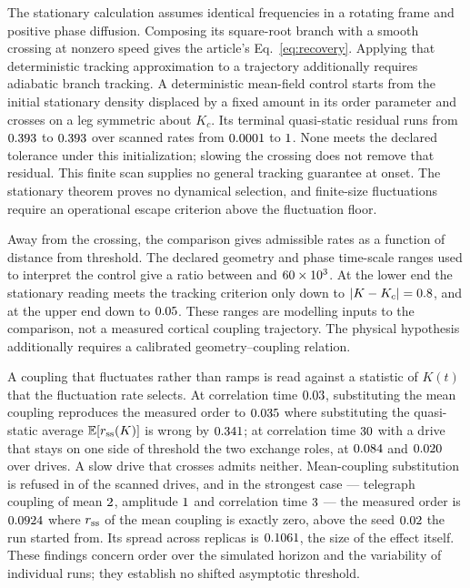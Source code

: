 \documentclass{article}
\begin{document}
The stationary calculation assumes identical frequencies in a rotating frame and positive phase diffusion. Composing its square-root branch with a smooth crossing at nonzero speed gives the article's Eq.~\eqref{eq:recovery}. Applying that deterministic tracking approximation to a trajectory additionally requires adiabatic branch tracking. A deterministic mean-field control starts from the initial stationary density displaced by a fixed amount in its order parameter and crosses on a leg symmetric about $K_c$. Its terminal quasi-static residual runs from $0.393$ to $0.393$ over scanned rates from $0.0001$ to $1$. None meets the declared tolerance under this initialization; slowing the crossing does not remove that residual. This finite scan supplies no general tracking guarantee at onset. The stationary theorem proves no dynamical selection, and finite-size fluctuations require an operational escape criterion above the fluctuation floor.

Away from the crossing, the comparison gives admissible rates as a function of distance from threshold. The declared geometry and phase time-scale ranges used to interpret the control give a ratio between \quasistaticRatioMin{} and $60\times10^{3}$. At the lower end the stationary reading meets the tracking criterion only down to $|K-K_c|=0.8$, and at the upper end down to $0.05$. These ranges are modelling inputs to the comparison, not a measured cortical coupling trajectory. The physical hypothesis additionally requires a calibrated geometry--coupling relation.

A coupling that fluctuates rather than ramps is read against a statistic of $K(t)$ that the fluctuation rate selects. At correlation time $0.03$, substituting the mean coupling reproduces the measured order to $0.035$ where substituting the quasi-static average $\mathbb{E}[r_{\rm ss}(K)]$ is wrong by $0.341$; at correlation time $30$ with a drive that stays on one side of threshold the two exchange roles, at $0.084$ and $0.020$ over \noiseSlowDrives{} drives. A slow drive that crosses admits neither. Mean-coupling substitution is refused in \noiseRefusals{} of the scanned drives, and in the strongest case --- telegraph coupling of mean $2$, amplitude $1$ and correlation time $3$ --- the measured order is $0.0924$ where $r_{\rm ss}$ of the mean coupling is exactly zero, above the seed $0.02$ the run started from. Its spread across replicas is $0.1061$, the size of the effect itself. These findings concern order over the simulated horizon and the variability of individual runs; they establish no shifted asymptotic threshold.
\end{document}
